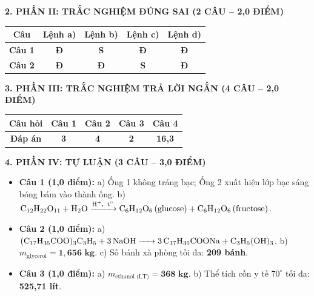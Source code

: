 \documentclass[11pt,a4paper]{article}
\begin{document}
\vspace{2pt}
\noindent
\textbf{\color{mainGreen}2. PHẦN II: TRẮC NGHIỆM ĐÚNG SAI (2 CÂU -- 2,0 ĐIỂM)}
\begin{center}
\renewcommand{\arraystretch}{1.2}
\begin{tabular}{|c|c|c|c|c|}
\hline
\rowcolor{tableGreen}
\textbf{Câu} & \textbf{Lệnh a)} & \textbf{Lệnh b)} & \textbf{Lệnh c)} & \textbf{Lệnh d)} \\
\hline
\textbf{Câu 1} & \textbf{\color{hfRed}Đ} & \textbf{\color{hfRed}S} & \textbf{\color{hfRed}Đ} & \textbf{\color{hfRed}Đ} \\
\hline
\textbf{Câu 2} & \textbf{\color{hfRed}Đ} & \textbf{\color{hfRed}Đ} & \textbf{\color{hfRed}S} & \textbf{\color{hfRed}Đ} \\
\hline
\end{tabular}
\end{center}

\vspace{2pt}
\noindent
\textbf{\color{mainGreen}3. PHẦN III: TRẮC NGHIỆM TRẢ LỜI NGẮN (4 CÂU -- 2,0 ĐIỂM)}
\begin{center}
\renewcommand{\arraystretch}{1.2}
\begin{tabular}{|c|c|c|c|c|}
\hline
\rowcolor{tableGreen}
\textbf{Câu hỏi} & \textbf{Câu 1} & \textbf{Câu 2} & \textbf{Câu 3} & \textbf{Câu 4} \\
\hline
\textbf{Đáp án} & \textbf{\color{hfRed}3} & \textbf{\color{hfRed}4} & \textbf{\color{hfRed}2} & \textbf{\color{hfRed}16,3} \\
\hline
\end{tabular}
\end{center}

\vspace{2pt}
\noindent
\textbf{\color{mainGreen}4. PHẦN IV: TỰ LUẬN (3 CÂU -- 3,0 ĐIỂM)}
\begin{itemize}[leftmargin=*,itemsep=1pt]
\item \textbf{Câu 1 (1,0 điểm):} a) Ống 1 không tráng bạc; Ống 2 xuất hiện lớp bạc sáng bóng bám vào thành ống. b) $\ce{C12H22O11 + H2O ->[H^+,\, t^\circ] C6H12O6 (glucose) + C6H12O6 (fructose)}$.
\item \textbf{Câu 2 (1,0 điểm):} a) $\ce{(C17H35COO)3C3H5 + 3NaOH -> 3C17H35COONa + C3H5(OH)3}$. b) $m_{\text{glycerol}} = \mathbf{1{,}656\text{ kg}}$. c) Số bánh xà phòng tối đa: \textbf{\color{hfRed}209 bánh}.
\item \textbf{Câu 3 (1,0 điểm):} a) $m_{\text{ethanol (LT)}} = \mathbf{368\text{ kg}}$. b) Thể tích cồn y tế $70^\circ$ tối đa: \textbf{\color{hfRed}525,71 lít}.
\end{itemize}
\end{document}
